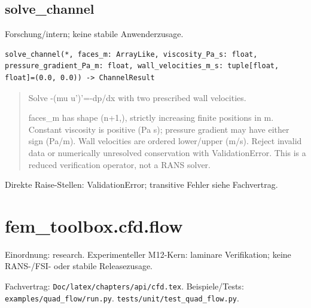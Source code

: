 \subsection{solve\_channel}
Forschung/intern; keine stabile Anwenderzusage.
\begin{lstlisting}
solve_channel(*, faces_m: ArrayLike, viscosity_Pa_s: float, pressure_gradient_Pa_m: float, wall_velocities_m_s: tuple[float, float]=(0.0, 0.0)) -> ChannelResult
\end{lstlisting}
\begin{quote}
Solve -(mu u')'=-dp/dx with two prescribed wall velocities.\par faces\_m has shape (n+1,), strictly increasing finite positions in m. Constant viscosity is positive (Pa s); pressure gradient may have either sign (Pa/m). Wall velocities are ordered lower/upper (m/s). Reject invalid data or numerically unresolved conservation with ValidationError. This is a reduced verification operator, not a RANS solver.
\end{quote}
Direkte Raise-Stellen: ValidationError; transitive Fehler siehe Fachvertrag.
\section{fem\_toolbox.cfd.flow}
Einordnung: research. Experimenteller M12-Kern: laminare Verifikation; keine RANS-/FSI- oder stabile Releasezusage.
\par Fachvertrag: \nolinkurl{Doc/latex/chapters/api/cfd.tex}. Beispiele/Tests:
\nolinkurl{examples/quad_flow/run.py}.
\nolinkurl{tests/unit/test_quad_flow.py}.
